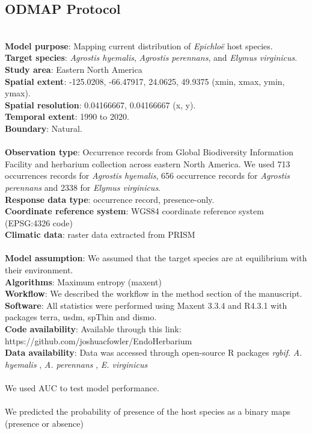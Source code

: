 \documentclass[11pt]{article}
\let\cite\citep
\begin{document}
	\subsection*{ODMAP Protocol}\label{sec:sdm}
{\color{blue}{Overview}}\\
\textbf {Model  purpose}: Mapping current distribution of \emph{Epichloë} host species. \\
\textbf {Target species}: \emph{Agrostis hyemalis}, \emph{Agrostis perennans}, and \emph{Elymus virginicus}. \\
\textbf {Study area}: Eastern North America \\
\textbf {Spatial extent}: -125.0208, -66.47917, 24.0625, 49.9375 (xmin, xmax, ymin, ymax).\\
\textbf {Spatial resolution}: 0.04166667, 0.04166667 (x, y).\\
\textbf {Temporal extent}: 1990 to 2020.\\
\textbf {Boundary}: Natural.\\
{\color{blue}{Data}}\\
\textbf {Observation type}: Occurrence records from  Global Biodiversity Information Facility and herbarium collection across eastern North America. We used 713 occurrences records for \emph{Agrostis hyemalis}, 656 occurrence records for \emph{Agrostis perennans} and 2338 for \emph{Elymus virginicus}.\\
\textbf{Response data type}: occurrence record, presence-only.\\
\textbf{Coordinate reference system}: WGS84 coordinate reference system (EPSG:4326 code)\\
\textbf{Climatic data}:  raster data extracted from PRISM  \\
{\color{blue}{Model }}\\
\textbf{Model assumption}: We assumed that the target species are at equilibrium with their environment. \\
\textbf{Algorithms}: Maximum entropy (maxent)\\
\textbf{Workflow}: We  described the workflow in the method section of the manuscript. \\
\textbf{Software}:  All statistics were performed using Maxent 3.3.4 and R4.3.1 with packages terra, usdm, spThin and dismo.\\
\textbf{Code availability}: Available through this link: https://github.com/joshuacfowler/EndoHerbarium \\
\textbf{Data availability}: Data was accessed through open-source R packages \emph{rgbif}. \emph{A. hyemalis} \cite{https://doi.org/10.15468/dl.ryqqcv}, \emph{A. perennans} \cite{https://doi.org/10.15468/dl.wtne24}, \emph{E.  virginicus} \cite{https://doi.org/10.15468/dl.yt76uh} \\
{\color{blue}{Assessment}}\\
We used AUC to test model performance.\\
{\color{blue}{Prediction }}\\
We predicted the probability of presence of the host species as a binary maps (presence or absence)
\end{document}
